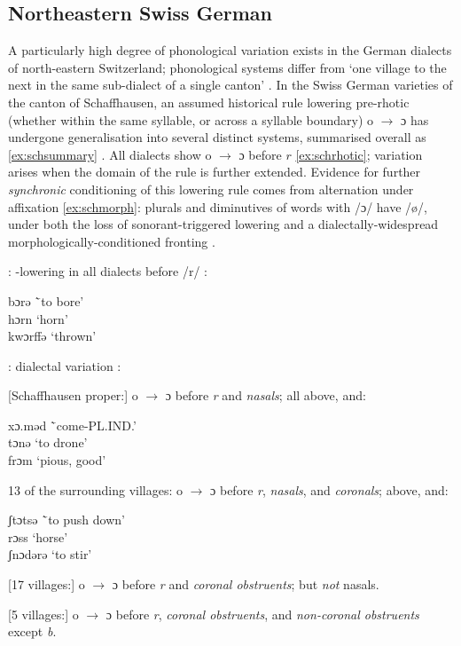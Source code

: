 \subsection{Northeastern Swiss German}\label{ss:schaffhausen}

A particularly high degree of phonological variation exists in the German dialects of north-eastern Switzerland; phonological systems differ from `one village to the next in the same sub-dialect of a single canton' \citep{Keel1982}. In the Swiss German varieties of the canton of Schaffhausen, an assumed historical rule lowering pre-rhotic (whether within the same syllable, or across a syllable boundary) o $\rightarrow$ ɔ has undergone generalisation into several distinct systems, summarised overall as \eqref{ex:schsummary} \citep{Keel1982, JandaJoseph2003}. All dialects show o $\rightarrow$ ɔ before $r$ \eqref{ex:schrhotic}; variation arises when the domain of the rule is further extended. Evidence for further \emph{synchronic} conditioning of this lowering rule comes from alternation under affixation \cref{ex:schmorph}: plurals and diminutives of words with /ɔ/ have /ø/, under both the loss of sonorant-triggered lowering and a dialectally-widespread morphologically-conditioned fronting \citep{Garrett2014}.

\vspace{12pt}
\begin{example}\label{ex:schrhotic} : -lowering in all dialects before /r/ \citep{Keel1982}:
\begin{tabbing}
        bɔrə \tab[3cm] \=`to bore' \\
        hɔrn \>`horn' \\
        kwɔrffə \>`thrown'
    \end{tabbing}
\end{example}

\begin{example}\label{ex:schsummary} : dialectal variation \citep{Keel1982}:

[Schaffhausen proper:] o $\rightarrow$ ɔ before \textit{r} and \textit{nasals}; all above, and:
\begin{tabbing}
    xɔ.məd \tab[3cm] \=`come-{\sc\scriptsize PL.IND.}' \\
    tɔnə \>`to drone' \\
    frɔm \>`pious, good'
\end{tabbing}
13 of the surrounding villages: o $\rightarrow$ ɔ before \textit{r}, \textit{nasals}, and \textit{coronals}; above, and:
\begin{tabbing}
  ʃtɔtsə \tab[3cm] \=`to push down' \\
  rɔss \>`horse' \\
  ʃnɔdərə \>`to stir'
\end{tabbing}
  [17 villages:] o $\rightarrow$ ɔ before \textit{r} and \textit{coronal obstruents}; but \textit{not} nasals.

  [5 villages:] o $\rightarrow$ ɔ before \textit{r}, \textit{coronal obstruents}, and \textit{non-coronal obstruents} except \textit{b}.

\end{example}

